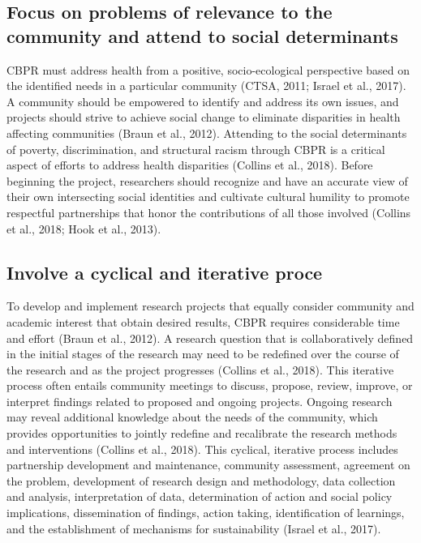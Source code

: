 \documentclass[
  11pt,
]{book}
\begin{document}
\subsection{Focus on problems of relevance to the community and attend to social determinants}\label{focus-on-problems-of-relevance-to-the-community-and-attend-to-social-determinants}

CBPR must address health from a positive, socio-ecological perspective based on the identified needs in a particular community (CTSA, 2011; Israel et al., 2017). A community should be empowered to identify and address its own issues, and projects should strive to achieve social change to eliminate disparities in health affecting communities (Braun et al., 2012). Attending to the social determinants of poverty, discrimination, and structural racism through CBPR is a critical aspect of efforts to address health disparities (Collins et al., 2018). Before beginning the project, researchers should recognize and have an accurate view of their own intersecting social identities and cultivate cultural humility to promote respectful partnerships that honor the contributions of all those involved (Collins et al., 2018; Hook et al., 2013).

\subsection{Involve a cyclical and iterative proce}\label{involve-a-cyclical-and-iterative-proce}

To develop and implement research projects that equally consider community and academic interest that obtain desired results, CBPR requires considerable time and effort (Braun et al., 2012). A research question that is collaboratively defined in the initial stages of the research may need to be redefined over the course of the research and as the project progresses (Collins et al., 2018). This iterative process often entails community meetings to discuss, propose, review, improve, or interpret findings related to proposed and ongoing projects. Ongoing research may reveal additional knowledge about the needs of the community, which provides opportunities to jointly redefine and recalibrate the research methods and interventions (Collins et al., 2018). This cyclical, iterative process includes partnership development and maintenance, community assessment, agreement on the problem, development of research design and methodology, data collection and analysis, interpretation of data, determination of action and social policy implications, dissemination of findings, action taking, identification of learnings, and the establishment of mechanisms for sustainability (Israel et al., 2017).
\end{document}
